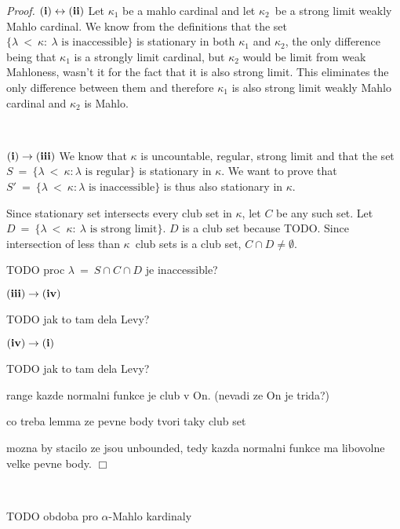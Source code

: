 \documentclass[12pt,a4paper]{article}
\newenvironment{proof}
{\noindent \textit{Proof.}}
{\hspace*{\fill} $\Box$}
\renewcommand{\iff}{\leftrightarrow}
\newcommand{\then}{\rightarrow}
\begin{document}
\begin{proof}
$\bold{(i) \iff (ii)}$
Let $\kappa_1$ be a mahlo cardinal and let $\kappa_2$ be a strong limit weakly Mahlo cardinal. We know from the definitions that the set $\{\lambda\ <\ \kappa:\ \lambda\mbox{ is inaccessible}\}$ is stationary in both $\kappa_1$ and $\kappa_2$, the only difference being that $\kappa_1$ is a strongly limit cardinal, but $\kappa_2$ would be limit from weak Mahloness, wasn't it for the fact that it is also strong limit. This eliminates the only difference between them and therefore $\kappa_1$ is also strong limit weakly Mahlo cardinal and $\kappa_2$ is Mahlo.

\

$\bold{(i) \then (iii)}$
We know that $\kappa$ is uncountable, regular, strong limit and that the set $S\ =\ \{\lambda\ <\ \kappa: \lambda\mbox{ is regular}\}$ is stationary in $\kappa$. 
We want to prove that $S'\ =\ \{\lambda\ <\ \kappa: \lambda\mbox{ is inaccessible}\}$ is thus also stationary in $\kappa$.

Since stationary set intersects every club set in $\kappa$, let $C$ be any such set. Let $D\ =\ \{ \lambda\ <\ \kappa:\ \lambda\mbox{ is strong limit}\}$. 
$D$ is a club set because TODO.
Since intersection of less than $\kappa$ club sets is a club set, $C \cap D \neq \emptyset$. 

TODO proc $\lambda\ =\ S \cap C \cap D$ je inaccessible?


$\bold{(iii) \then (iv)}$

TODO jak to tam dela Levy? 

$\bold{(iv) \then (i)}$

TODO jak to tam dela Levy? 

range kazde normalni funkce je club v On. (nevadi ze On je trida?)

co treba lemma ze pevne body tvori taky club set

mozna by stacilo ze jsou unbounded, tedy kazda normalni funkce ma libovolne velke pevne body.
\end{proof}

\

TODO obdoba pro $\alpha$-Mahlo kardinaly

\
\end{document}
